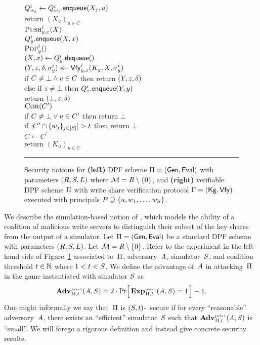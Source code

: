 \begin{figure}[t]
{    \\
    \tab $Q_{w_j}^i \gets Q_{w_j}^i.\mathsf{enqueue}(X_j, u)$\\
    return $(X_u)_{u\in C}$
    \\[6pt]
    \underline{$\textsc{Push}_{y,x}^i(X)$}\\[2pt]
      $Q_y^i.\mathsf{enqueue}(X, x)$
    \\[6pt]
    \underline{$\textsc{Pop}_{y}^i()$}\\[2pt]
      $(X, x) \gets Q_y^i.\mathsf{dequeue}()$\\
      $(Y, z, \delta, \sigma_y^i) \mathrel{\leftarrow\mkern-14mu\leftarrow} \mathsf{Vfy}_{y,x}^i(K_y, X, \sigma_y^i)$\\
      if $C \ne \bot \wedge v \in C$ then return $(Y, z, \delta)$\\
      else if $z \ne \bot$ then $Q_z^i.\mathsf{enqueue}(Y, y)$\\
      return $(\bot, z, \delta)$
    \\[6pt]
    \underline{$\textsc{Cor}(C^\prime)$}\\[2pt]
    if $C \ne \bot \vee u \in C^\prime$ then return $\bot$\\
    if $|C^\prime \cap \{w_j\}_{j\in[S]}| > t$ then return $\bot$\\
    $C \gets C^\prime$\\
    return $(K_u)_{u\in C}$
  }
  \caption{Security notions for \textbf{(left)} DPF scheme $\mathrm{\Pi} = (\mathsf{Gen},
  \mathsf{Eval})$ with parameters $(R, S, L)$ where $\mathcal{M} = R
  \setminus \{0\}$, and
  \textbf{(right)} verifiable DPF scheme $\mathrm{\Pi}$ with write share verification
  protocol $\mathrm{\Gamma} = (\mathsf{Kg}, \mathsf{Vfy})$ executed with principals $P \supseteq \{u, w_1,
  \ldots, w_S\}$.}
  \vspace{6pt}\hrule
  \label{fig-priv}
\end{figure}

We describe the simulation-based notion of \cite{riposte,dpf}, which models the
ability of a coalition of malicious write servers to distinguish their subset of
the key shares from the output of a simulator. Let $\mathrm{\Pi} = (\mathsf{Gen}, \mathsf{Eval})$ be a
standard DPF scheme with parameters $(R, S, L)$. Let $\mathcal{M} = R
\setminus \{0\}$. Refer to the experiment in the left-hand side of
Figure~\ref{fig-priv} associated to~$\mathrm{\Pi}$, adversary~$\mathit{A}$,
simulator~$\mathit{S}$, and coalition threshold $t \in \mathbb{N}$ where $1 < t < S$.
We define the advantage of~$\mathit{A}$ in attacking~$\mathrm{\Pi}$ in the game instantiated
with simulator $\mathit{S}$ as
\[
  \adv{\privone}_{\dpf,t}(\advA,\advS) = 2 \cdot
  \Prob{ \game{\privone}_{\dpf,t}(\advA,\advS) \outputs \true } - 1.
\]
One might informally we say that~$\mathrm{\Pi}$ is $(S,t)$-\privone~secure if for
every ``reasonable'' adversary~$\mathit{A}$, there exists an ``efficient''
simulator~$\mathit{S}$ such that $\adv{\privone}_{\dpf,t}(\advA,\advS)$ is ``small''.
We will forego a rigorous definition and instead give concrete security results.

